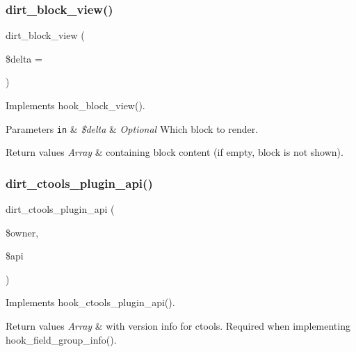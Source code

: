\subsubsection{\texorpdfstring{dirt\+\_\+block\+\_\+view()}{dirt\_block\_view()}}
{\footnotesize\ttfamily dirt\+\_\+block\+\_\+view (\begin{DoxyParamCaption}\item[{}]{\$delta = {\ttfamily \textquotesingle{}\textquotesingle{}} }\end{DoxyParamCaption})}

Implements hook\+\_\+block\+\_\+view().


\begin{DoxyParams}[1]{Parameters}
\mbox{\tt in}  & {\em \$delta} & {\itshape Optional} Which block to render.\\
\hline
\end{DoxyParams}

\begin{DoxyRetVals}{Return values}
{\em Array} & containing block content (if empty, block is not shown). \\
\hline
\end{DoxyRetVals}
\mbox{\label{dirt_8module_aac8181e5fc6a9a9b41e8030ea69ff309}} 
\subsubsection{\texorpdfstring{dirt\+\_\+ctools\+\_\+plugin\+\_\+api()}{dirt\_ctools\_plugin\_api()}}
{\footnotesize\ttfamily dirt\+\_\+ctools\+\_\+plugin\+\_\+api (\begin{DoxyParamCaption}\item[{}]{\$owner,  }\item[{}]{\$api }\end{DoxyParamCaption})}

Implements hook\+\_\+ctools\+\_\+plugin\+\_\+api().


\begin{DoxyRetVals}{Return values}
{\em Array} & with version info for ctools. Required when implementing hook\+\_\+field\+\_\+group\+\_\+info(). \\
\hline
\end{DoxyRetVals}
\mbox{\label{dirt_8module_abd03cb06ddc53ccff78870f36cf3a41e}} 
